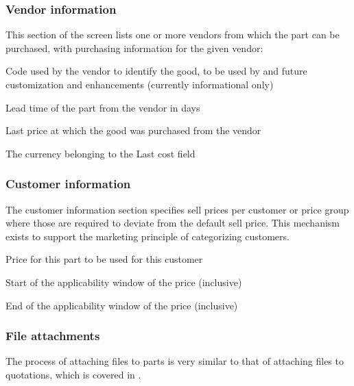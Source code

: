 \subsubsection{Vendor information}
\label{subsubsec-parts-vendor-information}

This section of the screen lists one or more vendors from which the part can be
purchased, with purchasing information for the given vendor:

\begin{description}[style=nextline]
\item [Vendor code] Code used by the vendor to identify the good, to be used by
     and future customization and enhancements (currently informational only)
\item [Lead time] Lead time of the part from the vendor in days
\item [Last cost] Last price at which the good was purchased from the vendor
\item [Currency] The currency belonging to the Last cost field
\end{description}

\subsubsection{Customer information}
\label{subsubsec-parts-customer-information}

The customer information section specifies sell prices per customer or price group
where those are required to deviate from the default sell price. This mechanism exists
to support the marketing principle of categorizing customers.

\begin{description}[style=nextline]
\item [Sell price] Price for this part to be used for this customer
\item [From] Start of the applicability window of the price (inclusive)
\item [To] End of the applicability window of the price (inclusive)
\end{description}

\subsubsection{File attachments}
\label{subsubsec-parts-file-attachments}

The process of attaching files to parts is very similar to that of
attaching files to quotations, which is covered in .

